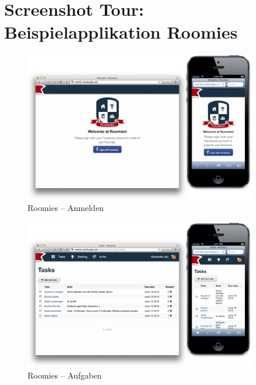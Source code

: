 \chapter{Screenshot Tour: Beispielapplikation Roomies}
\label{sec:roomies-screenshots}

\begin{figure}[H]
	\centering
	\includegraphics[width=0.9\textwidth]{content/appendix/roomies-screenshots/login.png}
	\caption{Roomies -- Anmelden}
	\label{fig:roomies-ss-login}
\end{figure}

\begin{figure}[H]
	\centering
	\includegraphics[width=0.9\textwidth]{content/appendix/roomies-screenshots/task.png}
	\caption{Roomies -- Aufgaben}
	\label{fig:roomies-ss-task}
\end{figure}

